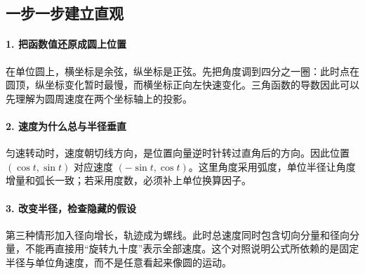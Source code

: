 \subsection*{一步一步建立直观}

\paragraph{1. 把函数值还原成圆上位置}

在单位圆上，横坐标是余弦，纵坐标是正弦。先把角度调到四分之一圈：此时点在圆顶，纵坐标变化暂时最慢，而横坐标正向左快速变化。三角函数的导数因此可以先理解为圆周速度在两个坐标轴上的投影。



\paragraph{2. 速度为什么总与半径垂直}

匀速转动时，速度朝切线方向，是位置向量逆时针转过直角后的方向。因此位置 $(\cos t,\sin t)$ 对应速度 $(-\sin t,\cos t)$。这里角度采用弧度，单位半径让角度增量和弧长一致；若采用度数，必须补上单位换算因子。



\paragraph{3. 改变半径，检查隐藏的假设}

第三种情形加入径向增长，轨迹成为螺线。此时总速度同时包含切向分量和径向分量，不能再直接用“旋转九十度”表示全部速度。这个对照说明公式所依赖的是固定半径与单位角速度，而不是任意看起来像圆的运动。

